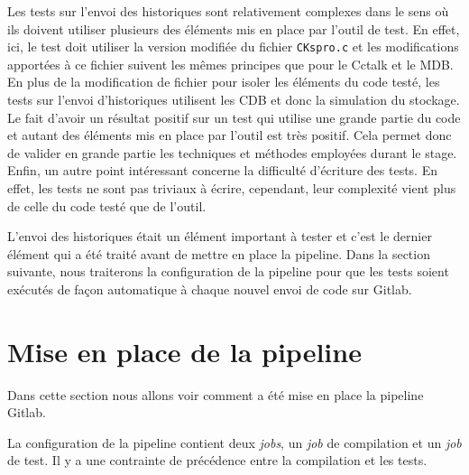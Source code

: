 \documentclass[a4paper]{article}
\begin{document}
Les tests sur l'envoi des historiques sont relativement complexes dans le sens
où ils doivent utiliser plusieurs des éléments mis en place par l'outil de test.
En effet, ici, le test doit utiliser la version modifiée du fichier
\verb|CKspro.c| et les modifications apportées à ce fichier suivent les mêmes
principes que pour le Cctalk et le MDB. En plus de la modification de fichier
pour isoler les éléments du code testé, les tests sur l'envoi d'historiques
utilisent les CDB et donc la simulation du stockage. Le fait d'avoir un résultat
positif sur un test qui utilise une grande partie du code et autant des éléments
mis en place par l'outil est très positif. Cela permet donc de valider en grande
partie les techniques et méthodes employées durant le stage. Enfin, un autre
point intéressant concerne la difficulté d'écriture des tests. En effet, les
tests ne sont pas triviaux à écrire, cependant, leur complexité vient plus de
celle du code testé que de l'outil.

L'envoi des historiques était un élément important à tester et c'est le dernier
élément qui a été traité avant de mettre en place la pipeline. Dans la section
suivante, nous traiterons la configuration de la pipeline pour que les tests
soient exécutés de façon automatique à chaque nouvel envoi de code sur Gitlab.
\section{Mise en place de la pipeline}%

Dans cette section nous allons voir comment a été mise en place la pipeline
Gitlab.

La configuration de la pipeline contient deux \textit{jobs}, un \textit{job} de
compilation et un \textit{job} de test. Il y a une contrainte de précédence
entre la compilation et les tests.
\end{document}
